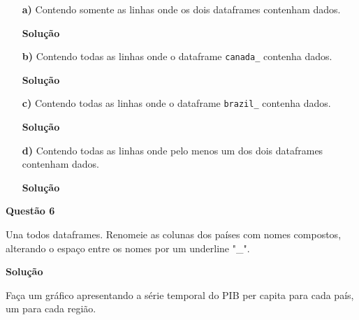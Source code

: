 \documentclass[12pt, a4paper]{article}
\begin{document}
\begin{itemize}
	\item[\textbf{a)}] Contendo somente as linhas onde os dois dataframes contenham dados.
	
	
	\textbf{Solução}
	
	
	
	
	
	\item[\textbf{b)}] Contendo todas as linhas onde o dataframe \texttt{canada\_} contenha dados.
	
	
	\textbf{Solução}
	
	
	
	
	
	\item[\textbf{c)}] Contendo todas as linhas onde o dataframe \texttt{brazil\_} contenha dados.
	
	
	\textbf{Solução}
	
	
	
	
	
	\item[\textbf{d)}] Contendo todas as linhas onde pelo menos um dos dois dataframes contenham dados.
	
	
	\textbf{Solução}
	
	
	
	
	
\end{itemize}



\textbf{Questão 6}

Una todos dataframes. Renomeie as colunas dos países com nomes compostos, alterando o espaço entre os nomes por um underline "\_". 


\textbf{Solução}





Faça um gráfico apresentando a série temporal do PIB per capita para cada país, um para cada região.
\end{document}

